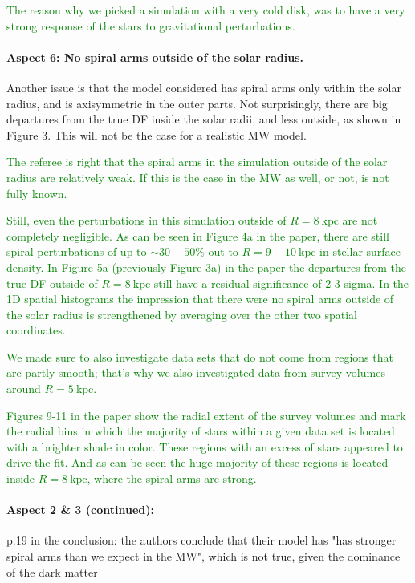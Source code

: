 \documentclass[10pt,a4paper]{article}
\newcommand{\Answer}[1]{\textcolor{Green}{#1}}
\begin{document}
\Answer{The reason why we picked a simulation with a very cold disk, was to have a very strong response of the stars to gravitational perturbations.}

\paragraph{Aspect 6: No spiral arms outside of the solar radius.} Another issue is that the model considered has spiral arms only within the solar
radius, and is axisymmetric in the outer parts. Not surprisingly, there are big
departures from the true DF inside the solar radii, and less outside, as shown in
Figure 3. This will not be the case for a realistic MW model. 

\Answer{The referee is right that the spiral arms in the simulation outside of the solar radius are relatively weak. If this is the case in the MW as well, or not, is not fully known.}

\Answer{Still, even the perturbations in this simulation outside of $R=8~\text{kpc}$ are not completely negligible. As can be seen in Figure 4a in the paper, there are still spiral perturbations of up to $\sim30-50\%$ out to $R=9-10~\text{kpc}$ in stellar surface density. In Figure 5a (previously Figure 3a) in the paper the departures from the true DF outside of $R=8~\text{kpc}$ still have a residual significance of 2-3 sigma. In the 1D spatial histograms the impression that there were no spiral arms outside of the solar radius is strengthened by averaging over the other two spatial coordinates.}

\Answer{We made sure to also investigate data sets that do not come from regions that are partly smooth; that's why we also investigated data from survey volumes around $R=5~\text{kpc}$.}

\Answer{Figures 9-11 in the paper show the radial extent of the survey volumes and mark the radial bins in which the majority of stars within a given data set is located with a brighter shade in color. These regions with an excess of stars appeared to drive the fit. And as can be seen the huge majority of these regions is located inside $R=8~\text{kpc}$, where the spiral arms are strong.}

\paragraph{Aspect 2 \& 3 (continued):} p.19 in the conclusion: the authors conclude that their model has "has stronger spiral arms than we expect in the MW", which is not true, given the dominance of
the dark matter
\end{document}
